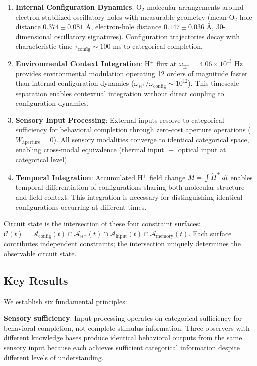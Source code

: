\documentclass[aps,prd,twocolumn,superscriptaddress,floatfix,nofootinbib]{revtex4-2}
\theoremstyle{remark}
\begin{document}
\begin{enumerate}
\item \textbf{Internal Configuration Dynamics}: O$_2$ molecular arrangements around electron-stabilized oscillatory holes with measurable geometry (mean O$_2$-hole distance $0.374 \pm 0.081$ \AA, electron-hole distance $0.147 \pm 0.036$ \AA, 30-dimensional oscillatory signatures). Configuration trajectories decay with characteristic time $\tau_{\text{config}} \sim 100$ ms to categorical completion.

\item \textbf{Environmental Context Integration}: H$^+$ flux at $\omega_{\text{H}^+} = 4.06 \times 10^{13}$ Hz provides environmental modulation operating 12 orders of magnitude faster than internal configuration dynamics ($\omega_{\text{H}^+}/\omega_{\text{config}} \sim 10^{12}$). This timescale separation enables contextual integration without direct coupling to configuration dynamics.

\item \textbf{Sensory Input Processing}: External inputs resolve to categorical sufficiency for behavioral completion through zero-cost aperture operations ($W_{\text{aperture}} = 0$). All sensory modalities converge to identical categorical space, enabling cross-modal equivalence (thermal input $\equiv$ optical input at categorical level).

\item \textbf{Temporal Integration}: Accumulated H$^+$ field change $M = \int \dot{H}^+ \, dt$ enables temporal differentiation of configurations sharing both molecular structure and field context. This integration is necessary for distinguishing identical configurations occurring at different times.
\end{enumerate}

Circuit state is the intersection of these four constraint surfaces: $\mathcal{C}(t) = \mathcal{A}_{\text{config}}(t) \cap \mathcal{A}_{\text{H}^+}(t) \cap \mathcal{A}_{\text{input}}(t) \cap \mathcal{A}_{\text{memory}}(t)$. Each surface contributes independent constraints; the intersection uniquely determines the observable circuit state.

\subsection{Key Results}

We establish six fundamental principles:

\textbf{Sensory sufficiency}: Input processing operates on categorical sufficiency for behavioral completion, not complete stimulus information. Three observers with different knowledge bases produce identical behavioral outputs from the same sensory input because each achieves sufficient categorical information despite different levels of understanding.
\end{document}
